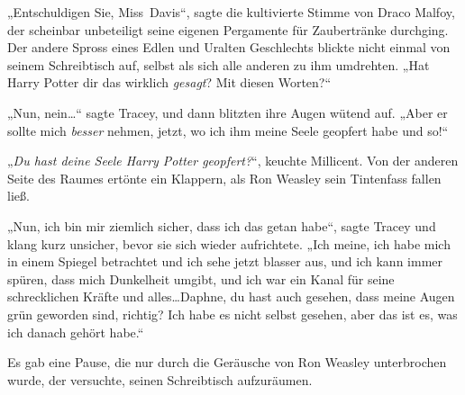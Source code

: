 „Entschuldigen Sie, Miss~Davis“, sagte die kultivierte Stimme von Draco Malfoy, der scheinbar unbeteiligt seine eigenen Pergamente für Zaubertränke durchging. Der andere Spross eines Edlen und Uralten Geschlechts blickte nicht einmal von seinem Schreibtisch auf, selbst als sich alle anderen zu ihm umdrehten. „Hat Harry Potter dir das wirklich \emph{gesagt}? Mit diesen Worten?“

„Nun, nein…“ sagte Tracey, und dann blitzten ihre Augen wütend auf. „Aber er sollte mich \emph{besser} nehmen, jetzt, wo ich ihm meine Seele geopfert habe und so!“

„\emph{Du hast deine Seele Harry Potter geopfert?}“, keuchte Millicent. Von der anderen Seite des Raumes ertönte ein Klappern, als Ron Weasley sein Tintenfass fallen ließ.

„Nun, ich bin mir ziemlich sicher, dass ich das getan habe“, sagte Tracey und klang kurz unsicher, bevor sie sich wieder aufrichtete. „Ich meine, ich habe mich in einem Spiegel betrachtet und ich sehe jetzt blasser aus, und ich kann immer spüren, dass mich Dunkelheit umgibt, und ich war ein Kanal für seine schrecklichen Kräfte und alles…Daphne, du hast auch gesehen, dass meine Augen grün geworden sind, richtig? Ich habe es nicht selbst gesehen, aber das ist es, was ich danach gehört habe.“

Es gab eine Pause, die nur durch die Geräusche von Ron Weasley unterbrochen wurde, der versuchte, seinen Schreibtisch aufzuräumen.

